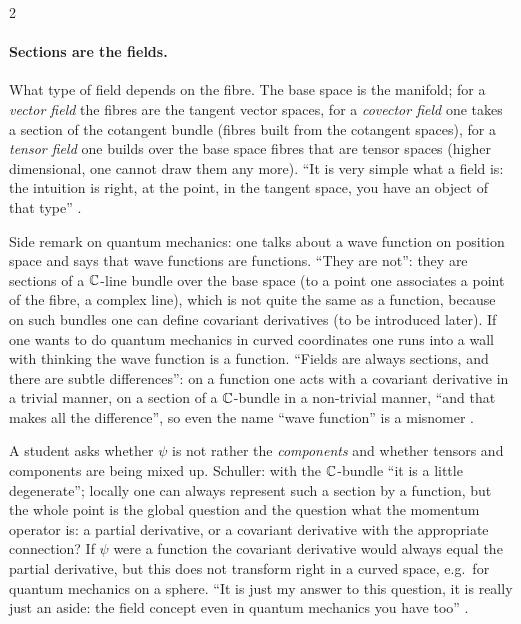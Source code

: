 \begin{paracol}{2}
\paragraph{Sections are the fields.} What type of field depends on the fibre. The base space is the manifold; for a \emph{vector field} the fibres are the tangent vector spaces, for a \emph{covector field} one takes a section of the cotangent bundle (fibres built from the cotangent spaces), for a \emph{tensor field} one builds over the base space fibres that are tensor spaces (higher dimensional, one cannot draw them any more).
``It is very simple what a field is: the intuition is right, at the point, in the tangent space, you have an object of that type'' .

\begin{aside}
Side remark on quantum mechanics: one talks about a wave function on position space and says that wave functions are functions. ``They are not'': they are sections of a $\mathbb{C}$-line bundle over the base space (to a point one associates a point of the fibre, a complex line), which is not quite the same as a function, because on such bundles one can define covariant derivatives (to be introduced later).
If one wants to do quantum mechanics in curved coordinates one runs into a wall with thinking the wave function is a function. ``Fields are always sections, and there are subtle differences'': on a function one acts with a covariant derivative in a trivial manner, on a section of a $\mathbb{C}$-bundle in a non-trivial manner, ``and that makes all the difference'', so even the name ``wave function'' is a misnomer
.
\end{aside}
\begin{coursenote}
A student asks whether $\psi$ is not rather the \emph{components} and whether tensors and components are being mixed up. Schuller: with the $\mathbb{C}$-bundle ``it is a little degenerate''; locally one can always represent such a section by a function, but the whole point is the global question and the question what the momentum operator is: a partial derivative, or a covariant derivative with the appropriate connection?
If $\psi$ were a function the covariant derivative would always equal the partial derivative, but this does not transform right in a curved space, e.g.\ for quantum mechanics on a sphere. ``It is just my answer to this question, it is really just an aside: the field concept even in quantum mechanics you have too'' .
\end{coursenote}


\end{paracol}
